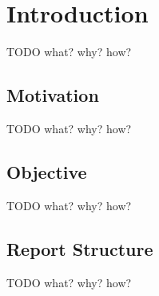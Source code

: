
\chapter{Introduction}
TODO what? why? how?
\section{Motivation}
TODO what? why? how?
\section{Objective}
TODO what? why? how?
\section{Report Structure}
TODO what? why? how?